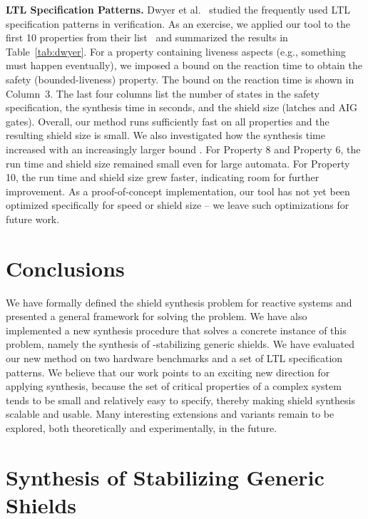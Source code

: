 \documentclass{llncs}
\newif \ifextended
\begin{document}
\noindent
\textbf{LTL Specification Patterns.}
Dwyer et al.~\cite{DwyerAC99} studied the frequently used LTL 
specification patterns in verification.  As an exercise, we applied our 
tool to the first 10 properties from their list~\cite{LTLpattern-URL} 
and summarized the results in Table~\ref{tab:dwyer}.  For a property 
containing liveness aspects (e.g., something must happen eventually), we 
imposed a bound on the reaction time to obtain the safety 
(bounded-liveness) property. The bound on the  reaction time is shown in 
Column~3.  The last four columns list the number of states in the safety 
specification, the synthesis time in seconds, and the shield size 
(latches and AIG gates). Overall, our method runs sufficiently fast on 
all properties and the resulting shield size is small. We also 
investigated how the synthesis time increased with an increasingly 
larger bound .  For Property 8 and Property 6, the run time and 
shield size remained small even for large automata. For Property 10, the 
run time and shield size grew faster, indicating room for further 
improvement.  As a proof-of-concept implementation, our tool has not yet 
been optimized specifically for speed or shield size -- we leave such 
optimizations for future work.

\section{Conclusions}
\label{sec:conc}

We have formally defined the shield synthesis problem for reactive 
systems and presented a general framework for solving the problem.  We 
have also implemented a new synthesis procedure that solves  a concrete 
instance of  this problem, namely the synthesis of -stabilizing 
generic shields. We have evaluated our new method  on two hardware 
benchmarks and a set of LTL specification patterns.  We believe that our 
work points to an exciting new direction for applying synthesis, because 
the set of critical properties of a complex system tends to be small and 
relatively easy to specify, thereby making shield synthesis scalable and 
usable. Many interesting extensions and variants remain to be explored, 
both theoretically and experimentally, in the future.


\ifextended
\newpage
\appendix

\section{Synthesis of Stabilizing Generic Shields}
\label{sec:app}
\end{document}
